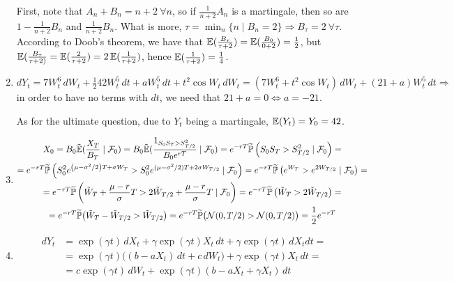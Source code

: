 \documentclass[12pt, a4paper]{article}
\newcommand{\cF}{\mathcal{F}}
\newcommand{\cN}{\mathcal{N}}
\begin{document}
\begin{enumerate}
First, note that $A_n + B_n = n + 2\ \forall n$, so if $\frac{1}{n+2} A_n$ is a martingale, then so are $1 - \frac{1}{n+2} B_n$ and $\frac{1}{n+2} B_n$. What is more, $\tau = \min_n \{n \mid B_n = 2\} \Rightarrow B_\tau = 2\ \forall \tau$. According to Doob's theorem, we have that $\operatorname{\mathbb{E}}(\frac{B_\tau}{\tau + 2}) = \operatorname{\mathbb{E}}(\frac{B_0}{0 + 2}) = \frac{1}{2}$, but $\operatorname{\mathbb{E}}(\frac{B_\tau}{\tau + 2)} = \operatorname{\mathbb{E}}(\frac{2}{\tau + 2}) = 2 \operatorname{\mathbb{E}}(\frac{1}{\tau + 2})$, hence $\operatorname{\mathbb{E}}(\frac{1}{\tau + 2}) = \frac{1}{4}$.

\item
$dY_t = 7W_t^6 \,dW_t + \frac{1}{2} 42W_t^5 \,dt + a W_t^5 \,dt + t^2 \cos W_t \,dW_t = \left(7W_t^6 + t^2 \cos W_t\right) \,dW_t + (21 + a) W_t^5 \,dt \Rightarrow$ in order to have no terms with $dt$, we need that $21 + a = 0 \Leftrightarrow a = -21$.

As for the ultimate question, due to $Y_t$ being a martingale, $\operatorname{\mathbb{E}}(Y_t) = Y_0 = 42$.

\item
\begin{multline*}
	X_0 = B_0 \tilde\E(\frac{X_T}{B_T} \mid \cF_0) = B_0 \tilde\E(\frac{1_{S_0 S_T > S_{T/2}^2}}{B_0 e^{rT}} \mid \cF_0) = e^{-rT} \widetilde{\P}\left(S_0 S_T > S_{T/2}^2 \mid \cF_0\right) =\\
	= e^{-rT} \widetilde{\P}\left(S_0^2 e^{\left(\mu - \sigma^2/2\right) T + \sigma W_T} > S_{0}^2 e^{(\mu - \sigma^2/2) T + 2\sigma W_{T/2}} \mid \cF_0\right) = e^{-rT} \widetilde{\P}\left(e^{W_T} > e^{2W_{T/2}} \mid \cF_0\right) =\\
	= e^{-rT} \widetilde{\P}\left(\tilde{W}_T + \frac{\mu - r}{\sigma} T > 2\tilde{W}_{T/2} + \frac{\mu - r}{\sigma} T \mid \cF_0\right) = e^{-rT} \widetilde{\P}\left(\tilde{W}_T > 2\tilde{W}_{T/2}\right) =\\= e^{-rT} \widetilde{\P}\big(\tilde{W}_T - \tilde{W}_{T/2} > \tilde{W}_{T/2}\big) = e^{-rT} \widetilde{\P}\big(\cN(0,T/2) > \cN(0,T/2)\big) = \frac{1}{2} e^{-rT}
\end{multline*}

\item

\begin{align*}
dY_t &= \exp(\gamma t) \,dX_t + \gamma \exp(\gamma t) X_t \,dt + \gamma \exp(\gamma t) \,dX_t dt =\\
&= \exp(\gamma t) \big((b - aX_t) \,dt + c \,dW_t\big) + \gamma \exp(\gamma t) X_t \,dt =\\
&= c \exp(\gamma t) \,dW_t + \exp(\gamma t) (b - aX_t + \gamma X_t) \,dt
\end{align*}


\end{enumerate}
\end{document}

